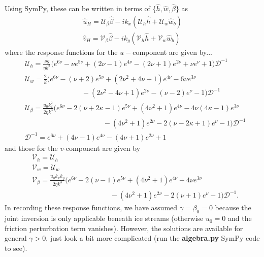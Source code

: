 \documentclass[paper=a4, fontsize=11pt]{article}
\begin{document}
Using SymPy, these can be written in terms of $\{\widehat{h},\widehat{w},\widehat{\beta}\}$ as
\begin{align}
\widehat{u}_H =    \mathcal{U}_{\beta} \widehat{\beta} -ik_x\left(\mathcal{U}_h\widehat{h} +  \mathcal{U}_w\widehat{w}_b\right) \label{uH}\\
\widehat{v}_H =  \mathcal{V}_{\beta} \widehat{\beta}-ik_y\left(\mathcal{V}_h\widehat{h} +  \mathcal{V}_w\widehat{w}_b\right)\label{vH}
\end{align}
where the response functions for the $u-$component are given by...
\begin{align}
& \mathcal{U}_h   =  \frac{\rho g}{\eta k^2} \bigg(e^{6\nu} -\nu e^{5\nu}+(2\nu-1)e^{4\nu} - (2\nu+1)e^{2\nu}+\nu e^{\nu} + 1  \bigg)\mathcal{D}^{-1}  \\
& \mathcal{U}_w  =  \frac{2}{k} \bigg(e^{6\nu}-(\nu+2)e^{5\nu}+(2\nu^2+4\nu+1)e^{4\nu}-6\nu e^{3\nu}  \nonumber \\ & \quad\quad\quad\quad\quad\quad\quad\quad - (2\nu^2-4\nu+1)e^{2\nu} - (\nu-2)e^{\nu}-1 \bigg)\mathcal{D}^{-1} \\
& \mathcal{U}_\beta  =  \frac{u_0 k_x^2}{2\eta k^3}\bigg(e^{6\nu}-2(\nu+2\kappa-1)e^{5\nu}+(4\nu^2+1)e^{4\nu}-4\nu(4\kappa-1)e^{3\nu} \nonumber \\ &
\quad\quad\quad\quad\quad\quad\quad\quad\quad\quad\quad -(4\nu^2+1)e^{2\nu}-2(\nu-2\kappa+1)e^{\nu}-1  \bigg)\mathcal{D}^{-1} \\
& \mathcal{D}^{-1}  =  e^{6\nu} + (4\nu-1)e^{4\nu}- (4\nu+1)e^{2\nu}+1
\end{align}
and those for the $v$-component are given by
\begin{align}
  & \mathcal{V}_h = \mathcal{U}_h\\
  & \mathcal{V}_w = \mathcal{U}_w\\
  & \mathcal{V}_\beta  =  \frac{u_0 k_x k_y}{2\eta k^3}\bigg(e^{6\nu}-2(\nu-1)e^{5\nu}+(4\nu^2+1)e^{4\nu}+4\nu e^{3\nu} \nonumber \\ &
  \quad\quad\quad\quad\quad\quad\quad\quad\quad\quad\quad -(4\nu^2+1)e^{2\nu}-2(\nu+1)e^{\nu}-1  \bigg)\mathcal{D}^{-1}.
\end{align}
In recording these response functions, we have assumed $\gamma=\beta_0=0$
because the joint inversion is only applicable beneath ice streams (otherwise $u_0=0$
and the friction perturbation term vanishes). However, the solutions are available
for general $\gamma>0$, just look a bit more complicated (run the \textbf{algebra.py} SymPy code
to see). \\ \\
\end{document}
